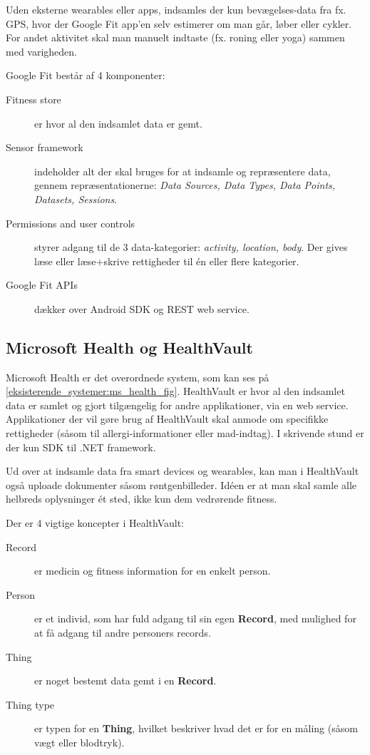 Uden eksterne wearables eller apps, indsamles der kun bevægelses-data fra fx. GPS, hvor der Google Fit app'en selv estimerer om man går, løber eller cykler.
For andet aktivitet skal man manuelt indtaste (fx. roning eller yoga) sammen med varigheden.

Google Fit består af 4 komponenter:

\begin{description}
\item[Fitness store] er hvor al den indsamlet data er gemt.
\item[Sensor framework] indeholder alt der skal bruges for at indsamle og repræsentere data, gennem repræsentationerne: \textit{Data Sources, Data Types, Data Points, Datasets, Sessions}.
\item[Permissions and user controls] styrer adgang til de 3 data-kategorier: \textit{activity, location, body}.
Der gives læse eller læse+skrive rettigheder til én eller flere kategorier.
\item[Google Fit APIs] dækker over Android SDK og REST web service.
\end{description}

\subsection{Microsoft Health og HealthVault}
Microsoft Health er det overordnede system, som kan ses på \cref{eksisterende_systemer:ms_health_fig}.
HealthVault er hvor al den indsamlet data er samlet og gjort tilgængelig for andre applikationer, via en web service.
Applikationer der vil gøre brug af HealthVault skal anmode om specifikke rettigheder (såsom til allergi-informationer eller mad-indtag).
I skrivende stund er der kun SDK til .NET framework.

Ud over at indsamle data fra smart devices og wearables, kan man i HealthVault også uploade dokumenter såsom røntgenbilleder.
Idéen er at man skal samle alle helbreds oplysninger ét sted, ikke kun dem vedrørende fitness.

Der er 4 vigtige koncepter i HealthVault:
\begin{description}
\item[Record] er medicin og fitness information for en enkelt person.
\item[Person] er et individ, som har fuld adgang til sin egen \textbf{Record}, med mulighed for at få adgang til andre personers records.
\item[Thing] er noget bestemt data gemt i en \textbf{Record}.
\item[Thing type] er typen for en \textbf{Thing}, hvilket beskriver hvad det er for en måling (såsom vægt eller blodtryk).
\end{description}

